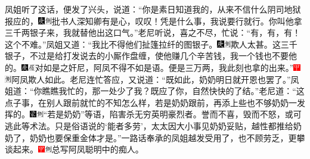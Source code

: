 凤姐听了这话，便发了兴头，说道：“你是素日知道我的，从来不信什么阴司地狱报应的，{\includegraphics[width=3mm]{../Images/00004}\includegraphics[width=3mm]{../Images/00011}\footnotesize \kaishu 批书人深知卿有是心，叹叹！}凭是什么事，我说要行就行。你叫他拿三千两银子来，我就替他出这口气。”老尼听说，喜之不尽，忙说：“有，有，有！这个不难。”凤姐又道：“我比不得他们扯篷拉纤的图银子。{\includegraphics[width=3mm]{../Images/00004}\includegraphics[width=3mm]{../Images/00011}\footnotesize \kaishu 欺人太甚。}这三千银子，不过是给打发说去的小厮作盘缠，使他赚几个辛苦钱，我一个钱也不要他的。{\includegraphics[width=3mm]{../Images/00004}\includegraphics[width=3mm]{../Images/00010}\footnotesize \kaishu 对如是之奸尼，阿凤不得不如是语。}便是三万两，我此刻也拿的出来。”{\includegraphics[width=3mm]{../Images/00002}\includegraphics[width=3mm]{../Images/00011}\footnotesize \kaishu 阿凤欺人如此。}老尼连忙答应，又说道：“既如此，奶奶明日就开恩也罢了。”凤姐道：“你瞧瞧我忙的，那一处少了我？既应了你，自然快快的了结。”老尼道：“这点子事，在别人跟前就忙的不知怎么样，若是奶奶跟前，再添上些也不够奶奶一发挥的。{\includegraphics[width=3mm]{../Images/00006}\includegraphics[width=3mm]{../Images/00011}\footnotesize \kaishu “若是奶奶”等语，陷害杀无穷英明豪烈者。誉而不喜，毁而不怒，或可逃此等术法。}只是俗语说的‘能者多劳’，太太因大小事见奶奶妥贴，越性都推给奶奶了，奶奶也要保重金体才是。”一路话奉承的凤姐越发受用了，也不顾劳乏，更攀谈起来。{\includegraphics[width=3mm]{../Images/00002}\includegraphics[width=3mm]{../Images/00011}\footnotesize \kaishu 总写阿凤聪明中的痴人。}

